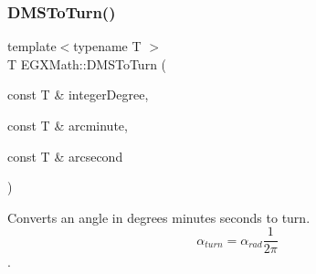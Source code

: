 \subsubsection{\texorpdfstring{D\+M\+S\+To\+Turn()}{DMSToTurn()}}
{\footnotesize\ttfamily template$<$typename T $>$ \\
T E\+G\+X\+Math\+::\+D\+M\+S\+To\+Turn (\begin{DoxyParamCaption}\item[{const T \&}]{integer\+Degree,  }\item[{const T \&}]{arcminute,  }\item[{const T \&}]{arcsecond }\end{DoxyParamCaption})}



Converts an angle in degrees minutes seconds to turn. \[\alpha_{turn}=\alpha_{rad}\frac{1}{2 \pi}\]. 

